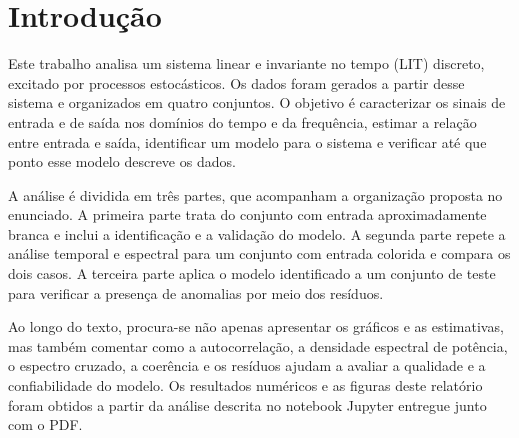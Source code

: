 \section{Introdução}

Este trabalho analisa um sistema linear e invariante no tempo (LIT) discreto,
excitado por processos estocásticos. Os dados foram gerados a partir desse sistema
e organizados em quatro conjuntos. O objetivo é caracterizar os sinais de entrada e
de saída nos domínios do tempo e da frequência, estimar a relação entre entrada e
saída, identificar um modelo para o sistema e verificar até que ponto esse modelo
descreve os dados.

A análise é dividida em três partes, que acompanham a organização proposta no
enunciado. A primeira parte trata do conjunto com entrada aproximadamente branca e
inclui a identificação e a validação do modelo. A segunda parte repete a análise
temporal e espectral para um conjunto com entrada colorida e compara os dois casos.
A terceira parte aplica o modelo identificado a um conjunto de teste para verificar
a presença de anomalias por meio dos resíduos.

Ao longo do texto, procura-se não apenas apresentar os gráficos e as estimativas,
mas também comentar como a autocorrelação, a densidade espectral de potência, o
espectro cruzado, a coerência e os resíduos ajudam a avaliar a qualidade e a
confiabilidade do modelo. Os resultados numéricos e as figuras deste relatório foram
obtidos a partir da análise descrita no notebook Jupyter entregue junto com o PDF.
